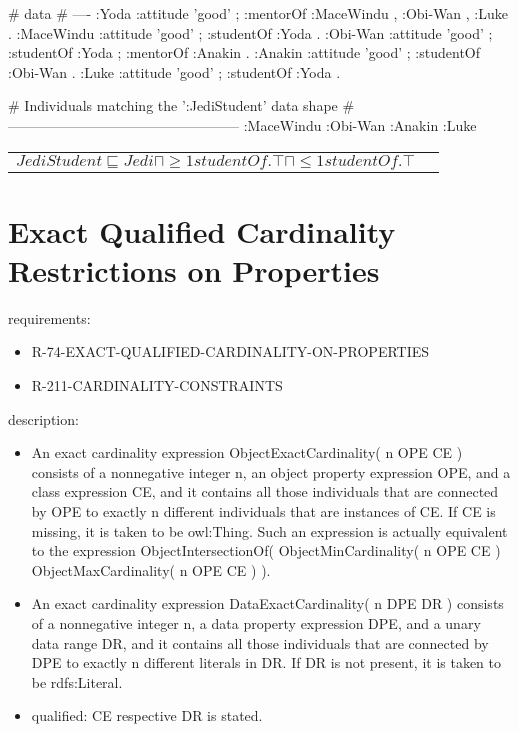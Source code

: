 \documentclass{llncs}
\newenvironment{DL}{
	\begin{center}
  \begin{tabular}{r l}

}{
  \end{tabular}
	\end{center}
}
\begin{document}
\begin{ex}
# data
# ----
:Yoda 
    :attitude 'good' ;
    :mentorOf :MaceWindu , :Obi-Wan , :Luke .
:MaceWindu
    :attitude 'good' ;
    :studentOf :Yoda .
:Obi-Wan 
    :attitude 'good' ;
    :studentOf :Yoda ;
    :mentorOf :Anakin .
:Anakin
    :attitude 'good' ; 
    :studentOf :Obi-Wan .
:Luke
    :attitude 'good' ;
    :studentOf :Yoda .
\end{ex}

\begin{ex}
# Individuals matching the ’:JediStudent’ data shape
# --------------------------------------------------
:MaceWindu :Obi-Wan :Anakin :Luke
\end{ex}

\begin{DL}
$JediStudent \sqsubseteq Jedi \sqcap \geq1 studentOf.\top \sqcap \leq1 studentOf.\top$ \\
\end{DL}

\section{Exact Qualified Cardinality Restrictions on Properties}

requirements:

\begin{itemize}
	\item R-74-EXACT-QUALIFIED-CARDINALITY-ON-PROPERTIES
	\item R-211-CARDINALITY-CONSTRAINTS
\end{itemize}

description:

\begin{itemize}
	\item An exact cardinality expression ObjectExactCardinality( n OPE CE ) consists of a nonnegative integer n, an object property expression OPE, and a class expression CE, and it contains all those individuals that are connected by OPE to exactly n different individuals that are instances of CE. If CE is missing, it is taken to be owl:Thing. Such an expression is actually equivalent to the expression ObjectIntersectionOf( ObjectMinCardinality( n OPE CE ) ObjectMaxCardinality( n OPE CE ) ).
	\item An exact cardinality expression DataExactCardinality( n DPE DR ) consists of a nonnegative integer n, a data property expression DPE, and a unary data range DR, and it contains all those individuals that are connected by DPE to exactly n different literals in DR. If DR is not present, it is taken to be rdfs:Literal. 
	\item qualified: CE respective DR is stated. 
\end{itemize}
\end{document}
